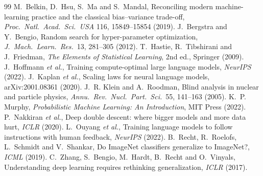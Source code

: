 \documentclass[11pt]{article}
\begin{document}
\begin{thebibliography}{99}\small
{} M.~Belkin, D.~Hsu, S.~Ma and S.~Mandal, Reconciling modern machine-learning practice and the classical bias--variance trade-off, \emph{Proc.\ Natl.\ Acad.\ Sci.\ USA} 116, 15849--15854 (2019).
 J.~Bergstra and Y.~Bengio, Random search for hyper-parameter optimization, \emph{J.\ Mach.\ Learn.\ Res.}\ 13, 281--305 (2012).
 T.~Hastie, R.~Tibshirani and J.~Friedman, \emph{The Elements of Statistical Learning}, 2nd ed., Springer (2009).
 J.~Hoffmann \emph{et al.}, Training compute-optimal large language models, \emph{NeurIPS} (2022).
 J.~Kaplan \emph{et al.}, Scaling laws for neural language models, arXiv:2001.08361 (2020).
 J.~R. Klein and A.~Roodman, Blind analysis in nuclear and particle physics, \emph{Annu.\ Rev.\ Nucl.\ Part.\ Sci.}\ 55, 141--163 (2005).
 K.~P. Murphy, \emph{Probabilistic Machine Learning: An Introduction}, MIT Press (2022).
 P.~Nakkiran \emph{et al.}, Deep double descent: where bigger models and more data hurt, \emph{ICLR} (2020).
 L.~Ouyang \emph{et al.}, Training language models to follow instructions with human feedback, \emph{NeurIPS} (2022).
 B.~Recht, R.~Roelofs, L.~Schmidt and V.~Shankar, Do ImageNet classifiers generalize to ImageNet?, \emph{ICML} (2019).
 C.~Zhang, S.~Bengio, M.~Hardt, B.~Recht and O.~Vinyals, Understanding deep learning requires rethinking generalization, \emph{ICLR} (2017).
\end{thebibliography}

\SourceNote
\end{document}
